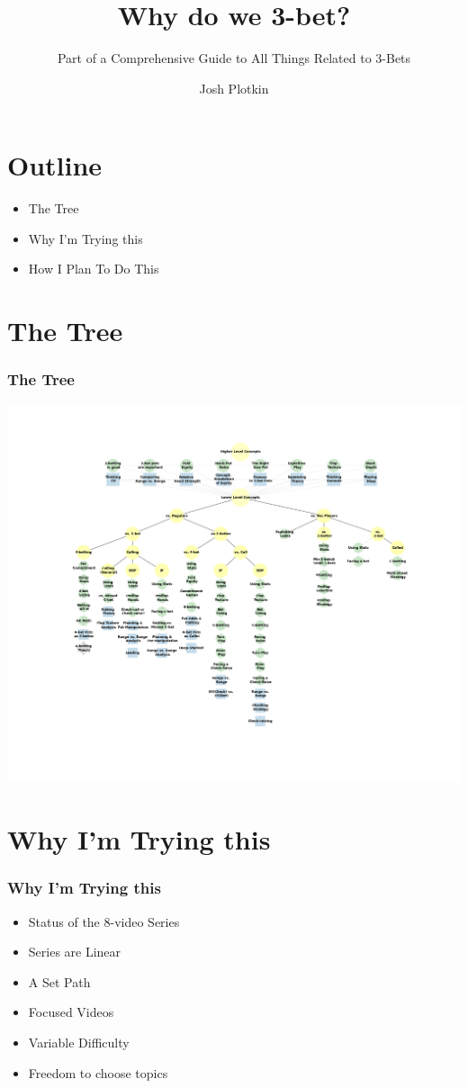 \documentclass{beamer}
\title{Why do we 3-bet?}
\subtitle{Part of a Comprehensive Guide to All Things Related to 3-Bets}
\author{Josh Plotkin}
\institute{DeucesCracked.com}
\date{}
\begin{document}
\frame{\titlepage}

\section{Outline}
\begin{frame}
\begin{itemize}
\frametitle{Outline}
\item The Tree
\pause
\item Why I'm Trying this
\pause
\item How I Plan To Do This
\pause
\end{itemize}
\end{frame}

\section{The Tree}
\begin{frame}
\frametitle{The Tree}
\includegraphics[keepaspectratio=true,width=.8\paperwidth]{InitialTree/tree.png}

\end{frame}


\section{Why I'm Trying this}
\begin{frame}
\frametitle{Why I'm Trying this}
\begin{itemize}
\item Status of the 8-video Series
\item Series are Linear
\item A Set Path
\item Focused Videos
\item Variable Difficulty
\item Freedom to choose topics
\end{itemize}
\end{frame}
\end{document}
